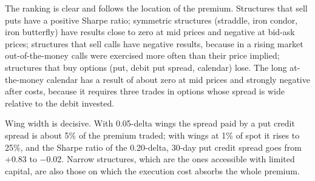 \documentclass[11pt,a4paper]{article}
\begin{document}
The ranking is clear and follows the location of the premium. Structures that sell puts have a positive Sharpe ratio; symmetric structures (straddle, iron condor, iron butterfly) have results close to zero at mid prices and negative at bid-ask prices; structures that sell calls have negative results, because in a rising market out-of-the-money calls were exercised more often than their price implied; structures that buy options (put, debit put spread, calendar) lose. The long at-the-money calendar has a result of about zero at mid prices and strongly negative after costs, because it requires three trades in options whose spread is wide relative to the debit invested.

Wing width is decisive. With 0.05-delta wings the spread paid by a put credit spread is about 5\% of the premium traded; with wings at 1\% of spot it rises to 25\%, and the Sharpe ratio of the 0.20-delta, 30-day put credit spread goes from +0.83 to $-$0.02. Narrow structures, which are the ones accessible with limited capital, are also those on which the execution cost absorbs the whole premium.
\end{document}
